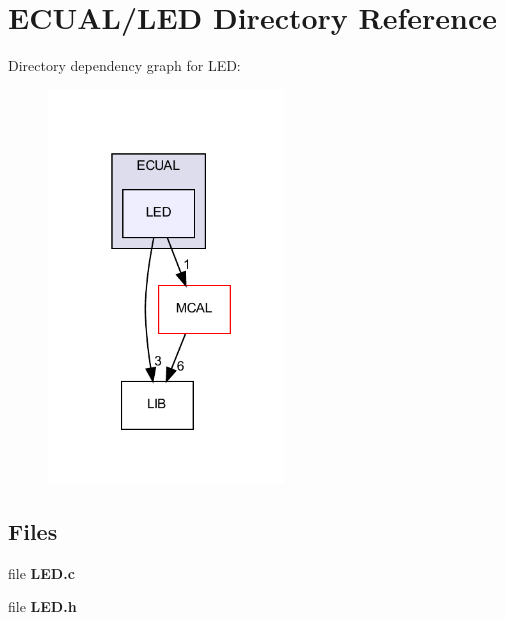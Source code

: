 \section{E\+C\+U\+A\+L/\+L\+ED Directory Reference}
\label{dir_fa81e7dae32579235d99a82f66f4491f}
Directory dependency graph for L\+ED\+:\nopagebreak
\begin{figure}[H]
\begin{center}
\leavevmode
\includegraphics[width=177pt]{dir_fa81e7dae32579235d99a82f66f4491f_dep}
\end{center}
\end{figure}
\subsection*{Files}
\begin{DoxyCompactItemize}
\item 
file \textbf{ L\+E\+D.\+c}
\item 
file \textbf{ L\+E\+D.\+h}
\end{DoxyCompactItemize}
